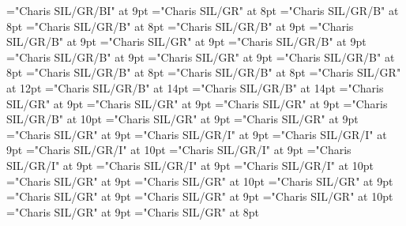 \documentclass[gps1,twoside]{article}
\begin{document}
\font\xitemxitemcrossreftypebefore="Charis SIL/GR/BI" at 9pt
\font\xitemxitemexamplebefore="Charis SIL/GR" at 8pt
\font\xitemxitemheadwordbefore="Charis SIL/GR/B" at 8pt
\font\xitemxitemheadwordminorbefore="Charis SIL/GR/B" at 8pt
\font\xitemxitemmainentryrefbefore="Charis SIL/GR/B" at 9pt
\font\xitemxitemmainentryrefminorbefore="Charis SIL/GR/B" at 9pt
\font\xitemxitempronunciationminorbefore="Charis SIL/GR" at 9pt
\font\xitemxitemsensecrossrefbefore="Charis SIL/GR/B" at 9pt
\font\xitemxitemsensemainentryrefbefore="Charis SIL/GR/B" at 9pt
\font\xitemxitemtranslationbefore="Charis SIL/GR" at 9pt
\font\xitemxitemheadwordsubbefore="Charis SIL/GR/B" at 8pt
\font\xitemxitemLexEntrypublishRootMinorPrimaryTargetMLHeadWordPubbefore="Charis SIL/GR/B" at 8pt
\font\xitemxitemLexEntrypublishStemMinorPrimaryTargetMLHeadWordPubbefore="Charis SIL/GR/B" at 8pt
\font\xitemtpi="Charis SIL/GR" at 12pt
\font{}="Charis SIL/GR/B" at 14pt
\font{}="Charis SIL/GR/B" at 14pt
\font{}="Charis SIL/GR" at 9pt
\font\entryletData="Charis SIL/GR" at 9pt
\font\mainheadwordentryletData="Charis SIL/GR" at 9pt
\font\spanbzhmainheadwordentryletData="Charis SIL/GR/B" at 10pt
\font\sensesentryletData="Charis SIL/GR" at 9pt
\font\sensecontentsensesentryletData="Charis SIL/GR" at 9pt
\font\sensesensecontentsensesentryletData="Charis SIL/GR" at 9pt
\font\morphosyntaxanalysissensesensecontentsensesentryletData="Charis SIL/GR/I" at 9pt
\font\partofspeechmorphosyntaxanalysissensesensecontentsensesentryletData="Charis SIL/GR/I" at 9pt
\font\spanenpartofspeechmorphosyntaxanalysissensesensecontentsensesentryletData="Charis SIL/GR/I" at 10pt
\font\slotsmorphosyntaxanalysissensesensecontentsensesentryletData="Charis SIL/GR/I" at 9pt
\font\slotslotsmorphosyntaxanalysissensesensecontentsensesentryletData="Charis SIL/GR/I" at 9pt
\font\nameslotslotsmorphosyntaxanalysissensesensecontentsensesentryletData="Charis SIL/GR/I" at 9pt
\font\spanennameslotslotsmorphosyntaxanalysissensesensecontentsensesentryletData="Charis SIL/GR/I" at 10pt
\font{}="Charis SIL/GR" at 9pt
\font\spanendefinitionorglosssensesensecontentsensesentryletData="Charis SIL/GR" at 10pt
\font\pronunciationsentryletData="Charis SIL/GR" at 9pt
\font\pronunciationpronunciationsentryletData="Charis SIL/GR" at 9pt
\font\formpronunciationpronunciationsentryletData="Charis SIL/GR" at 9pt
\font\spanbzhfonipaformpronunciationpronunciationsentryletData="Charis SIL/GR" at 10pt
\font\examplessensesensecontentsensesentryletData="Charis SIL/GR" at 9pt
\font\exampleexamplessensesensecontentsensesentryletData="Charis SIL/GR" at 8pt
\end{document}
